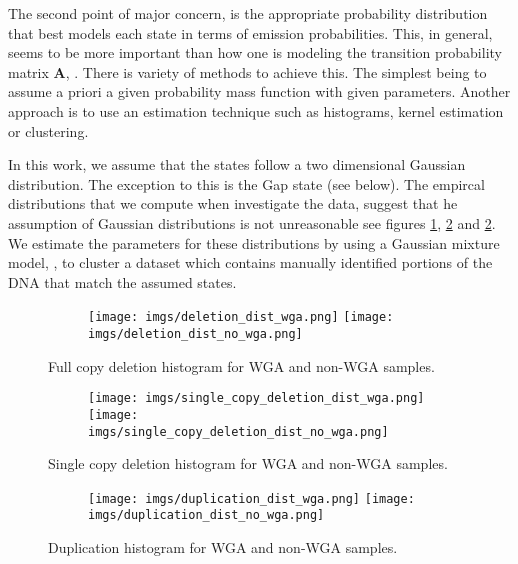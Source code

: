The second point of major concern, is the appropriate probability distribution that best models each state in terms of emission probabilities. This, in general, seems to be more important than how one is modeling the transition probability matrix $\mathbf{A}$, \cite{rabiner2009}.  There is variety of methods to achieve this. The simplest being to assume a priori a given probability mass function with given parameters. Another approach is to  use an estimation technique such as histograms, kernel estimation or clustering. 

In this work, we assume that the states follow a two dimensional Gaussian distribution. The exception to this is the Gap state (see below). The empircal distributions that we compute when investigate the data, suggest that he assumption of Gaussian distributions is not unreasonable see figures \ref{fig:image1}, \ref{fig:image2} and \ref{fig:image2}. We estimate the parameters for these distributions by using a Gaussian mixture model, \cite{flach2012}, to cluster a dataset which contains manually identified portions of the DNA that match the assumed states. 
\begin{figure}[h]
	\begin{subfigure}{}
		\texttt{[image: imgs/deletion\_dist\_wga.png]}
		\texttt{[image: imgs/deletion\_dist\_no\_wga.png]}	
	\end{subfigure}
	
	\caption{Full copy deletion histogram for WGA and non-WGA samples.  }
	\label{fig:image1}
\end{figure}


\begin{figure}[h]
	\begin{subfigure}{}
		\texttt{[image: imgs/single\_copy\_deletion\_dist\_wga.png]}
		\texttt{[image: imgs/single\_copy\_deletion\_dist\_no\_wga.png]}	
	\end{subfigure}
	
	\caption{Single copy deletion histogram for WGA and non-WGA samples.  }
	\label{fig:image2}
\end{figure}


\begin{figure}[h]
	\begin{subfigure}{}
		\texttt{[image: imgs/duplication\_dist\_wga.png]}
		\texttt{[image: imgs/duplication\_dist\_no\_wga.png]}	
	\end{subfigure}
	
	\caption{Duplication histogram for WGA and non-WGA samples.  }
	\label{fig:image3}
\end{figure}

